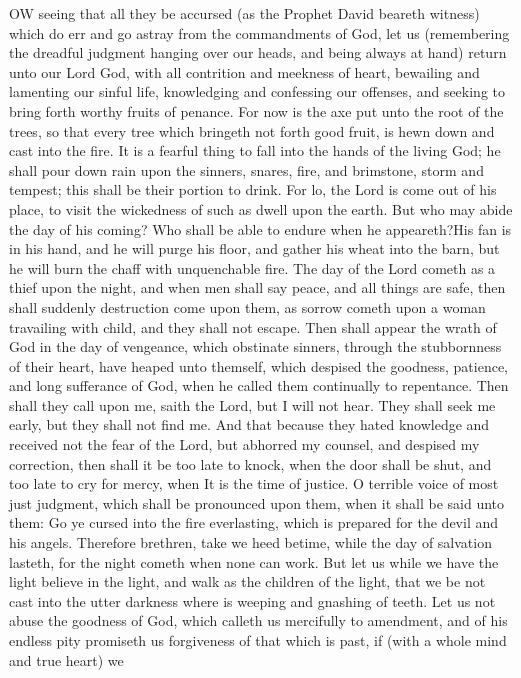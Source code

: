 OW seeing that all they be
accursed (as the Prophet David beareth witness) which do err and go astray from
the commandments of God, let us (remembering the dreadful judgment hanging over our heads,
and being always at hand) return unto our Lord God, with all contrition and meekness of
heart, bewailing and lamenting our sinful life, knowledging and confessing our offenses,
and seeking to bring forth worthy fruits of penance. For now is the axe put unto the root
of the trees, so that every tree which bringeth not forth good fruit, is hewn down and
cast into the fire. It is a fearful thing to fall into the hands of the living
God; he shall pour down rain upon the sinners, snares, fire, and brimstone,
storm and tempest; this shall be their portion to drink. For lo, the Lord is
come out of his place, to visit the wickedness of such as dwell upon the earth. But
who may abide the day of his coming? Who shall be able to endure when he appeareth?\textbf{}His
fan is in his hand, and he will purge his floor, and gather his wheat into the barn, but
he will burn the chaff with unquenchable fire. The day of the Lord cometh as a thief upon
the night, and when men shall say peace, and all things are safe, then shall suddenly
destruction come upon them, as sorrow cometh upon a woman travailing with child, and they
shall not escape. Then shall appear the wrath of God in the day of vengeance,
which obstinate sinners, through the stubbornness of their heart, have heaped unto
themself, which despised the goodness, patience, and long sufferance of God, when he
called them continually to repentance. Then shall they call upon me, saith the Lord, but I
will not hear. They shall seek me early, but they shall not find me. And that because they
hated knowledge and received not the fear of the Lord, but abhorred my counsel, and
despised my correction, then shall it be too late to knock, when the door shall
be shut, and too late to cry for mercy, when It is the time of justice. O terrible voice
of most just judgment, which shall be pronounced upon them, when it shall be said unto
them: Go ye cursed into the fire everlasting, which is prepared for the devil and his
angels. Therefore brethren, take we heed betime, while the day of salvation
lasteth, for the night cometh when none can work. But let us while we have the light
believe in the light, and walk as the children of the light, that we be not cast into the
utter darkness where is weeping and gnashing of teeth. Let us not abuse the
goodness of God, which calleth us mercifully to amendment, and of his endless pity
promiseth us forgiveness of that which is past, if (with a whole mind and true heart) we
